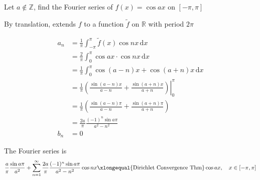 \begin{example}
    Let $a\notin\mathbb{Z}$, find the Fourier series of $f(x)=\cos ax$ on $[-\pi,\pi]$

    By translation, extends $f$ to a function $\tilde{f}$ on $\mathbb{R}$ with period $2\pi$

    \begin{align*}
        a_n
         & =\frac{1}{\pi}\int_{-\pi}^{\pi}\tilde{f}(x)\cos nx\,\mathrm{d}x                               \\
         & =\frac{2}{\pi}\int_0^{\pi}\cos ax\cdot\cos nx\,\mathrm{d}x                                    \\
         & =\frac{1}{\pi}\int_0^{\pi}\cos(a-n)x+\cos(a+n)x\,\mathrm{d}x                                  \\
         & =\frac{1}{\pi}\left.\left(\frac{\sin(a-n)x}{a-n}+\frac{\sin(a+n)x}{a+n}\right)\right|_0^{\pi} \\
         & =\frac{1}{\pi}\left(\frac{\sin(a-n)\pi}{a-n}+\frac{\sin(a+n)\pi}{a+n}\right)                  \\
         & =\frac{2a}{\pi}\frac{(-1)^n\sin a\pi}{a^2-n^2}                                                \\
        b_n
         & =0
    \end{align*}

    The Fourier series is
    $$\frac{a}{\pi}\frac{\sin a\pi}{a^2}+\sum_{n=1}^{\infty}\frac{2a}{\pi}\frac{(-1)^n\sin a\pi}{a^2-n^2}\cos nx\xlongequal{\text{Dirichlet Convergence Thm}}\cos ax,\quad x\in[-\pi,\pi]$$
\end{example}